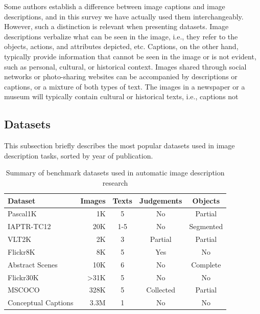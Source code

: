 Some authors establish a difference between image captions and image descriptions, and in this survey we have actually used them interchangeably. However, such a distinction is relevant when presenting datasets. Image descriptions verbalize what can be seen in the image, i.e., they refer to the objects, actions, and attributes depicted, etc. Captions, on the other hand, typically provide information that cannot be seen in the image or is not evident, such as personal, cultural, or historical context. Images shared through social networks or photo-sharing websites can be accompanied by descriptions or captions, or a mixture of both types of text. The images in a newspaper or a museum will typically contain cultural or historical texts, i.e., captions not 

\subsection{Datasets}

This subsection briefly describes the most popular datasets used in image description tasks, sorted by year of publication.

\begin{table}[hpt]
    \caption{Summary of benchmark datasets used in automatic image description research}
    \label{tab:datasets}
    \begin{tabular}{l | r | c | c | c}
        Dataset &  Images & Texts & Judgements & Objects \\
        \hline
        Pascal1K \citep{Rashtchian2010} & 1K  & 5 & No & Partial \\
        IAPTR-TC12 \citep{Escalante2010} & 20K  & 1-5  & No & Segmented \\
        VLT2K \citep{Elliott2013} & 2K  & 3  & Partial & Partial \\
        Flickr8K \citep{Rashtchian2010} & 8K & 5 & Yes & No \\
        Abstract Scenes \citep{Zitnick2013} & 10K & 6 & No & Complete \\
        Flickr30K \citep{Young2014} & >31K  & 5 & No & No \\
        MSCOCO \citep{Lin2014} & 328K & 5 & Collected & Partial \\
        Conceptual Captions \citep{Sharma2018}  & 3.3M  & 1  & No & No \\
    \end{tabular}
\end{table}

